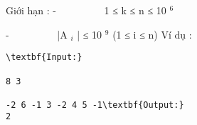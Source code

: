 Giới hạn :
-          1 ≤ k ≤ n ≤ 10   $^    6   $

   -          |A   $_    i   $   | ≤ 10   $^    9   $   (1 ≤ i ≤ n)
Ví dụ :
\begin{verbatim}
\textbf{Input:}

8 3

-2 6 -1 3 -2 4 5 -1\textbf{Output:}
2\end{verbatim}
